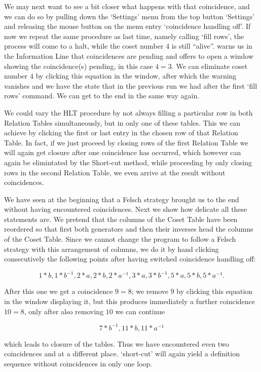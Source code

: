 We may next want to see a bit closer what happens with that
coincidence, and we can do so by pulling down the `Settings' menu from
the top button `Settings' and releasing the mouse button on the menu
entry `coincidence handling off'. If now we repeat the same procedure
as last time, namely calling `fill rows', the process will come to a
halt, while the coset number $4$ is still ``alive''. {\ITC} warns us in
the Information Line that coincidences are pending and offers to open
a window showing the coincidence(s) pending, in this case $4 = 3$. We
can eliminate coset number $4$ by clicking this equation in the
window, after which the warning vanishes and we have the state that in
the previous run we had after the first `fill rows' command. We can
get to the end in the same way again.


We could vary the HLT procedure by not always filling a particular row
in both Relation Tables simultaneously, but in only one of these
tables. This we can achieve by clicking the first or last entry in
the chosen row of that Relation Table. In fact, if we just proceed by
closing rows of the first Relation Table we will again get closure
after one coincidence has occurred, which however can again be
elimintated by the Short-cut method, while proceeding by only closing
rows in the second Relation Table, we even arrive at the result
without coincidences.

We have seen at the beginning that a Felsch strategy brought us to the
end without having encountered coincidences. Next we show how delicate
all these statements are. We pretend that the columns of the Coset
Table have been reordered so that first both generators and then their
inverses head the columns of the Coset Table. Since we cannot change
the program to follow a Felsch strategy with this arrangement of
columns, we do it by hand clicking consecutively the following points
after having switched coincidence handling off:

$$
  1*b,
  1*b^{-1},
  2*a,
  2*b,
  2*a^{-1},
  3*a,
  3*b^{-1},
  5*a,
  5*b,
  5*a^{-1}.
$$

After this one we get a coincidence $9 = 8$; we remove $9$ by clicking
this equation in the window displaying it, but this produces
immediately a further coincidence $10 = 8$, only after also removing
$10$ we can continue

$$
  7*b^{-1},
  11*b,
  11*a^{-1}
$$

which leads to closure of the tables. Thus we have encountered even
two coincidences and at a different place. `short-cut' will again
yield a definition sequence without coincidences in only one loop.

